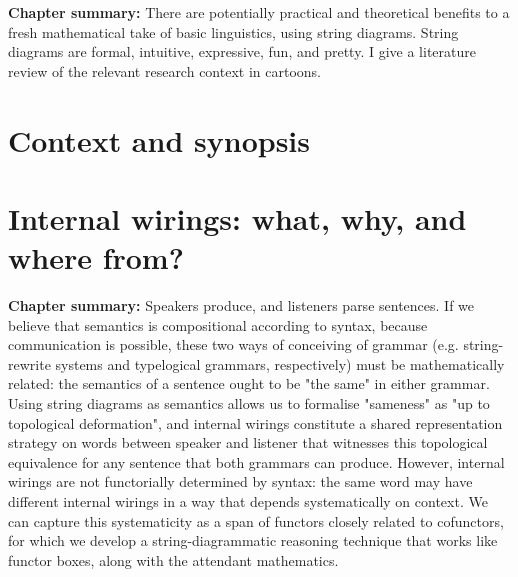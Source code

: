 



\maketitle%

\tableofcontents{}

\setcounter{chapter}{-1}
\textbf{Chapter summary:} There are potentially practical and theoretical benefits to a fresh mathematical take of basic linguistics, using string diagrams. String diagrams are formal, intuitive, expressive, fun, and pretty. I give a literature review of the relevant research context in cartoons.
\chapter{Context and synopsis}
\newpage

\newpage
\label{sec:proctheory}
\newpage


\setcounter{chapter}
\chapter{Internal wirings: what, why, and where from?}
\textbf{Chapter summary:} Speakers produce, and listeners parse sentences. If we believe that semantics is compositional according to syntax, because communication is possible, these two ways of conceiving of grammar (e.g. string-rewrite systems and typelogical grammars, respectively) must be mathematically related: the semantics of a sentence ought to be "the same" in either grammar. Using string diagrams as semantics allows us to formalise "sameness" as "up to topological deformation", and internal wirings constitute a shared representation strategy on words between speaker and listener that witnesses this topological equivalence for any sentence that both grammars can produce. However, internal wirings are not functorially determined by syntax: the same word may have different internal wirings in a way that depends systematically on context. We can capture this systematicity as a span of functors closely related to cofunctors, for which we develop a string-diagrammatic reasoning technique that works like functor boxes, along with the attendant mathematics.
\newpage



